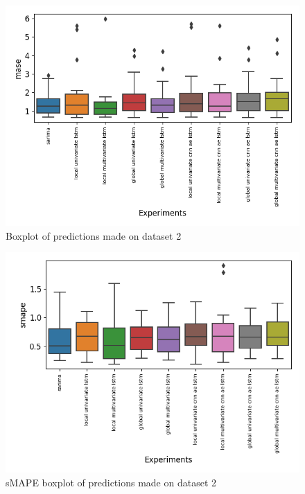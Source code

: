 \begin{figure}[h!]
  \centering
  \includegraphics[width=\textwidth]{./figs/results/boxplot/mase-dataset_2.png}
  \hfill
  \caption{Boxplot of predictions made on dataset 2}
  \label{fig:results:boxplot-mase-dataset-2-mase}
\end{figure}

\begin{figure}[h!]
  \centering
  \includegraphics[width=\textwidth]{./figs/results/boxplot/smape-dataset_2.png}
  \hfill
  \caption{sMAPE boxplot of predictions made on dataset 2}
  \label{fig:results:boxplot-mase-dataset-2-smape}
\end{figure}

